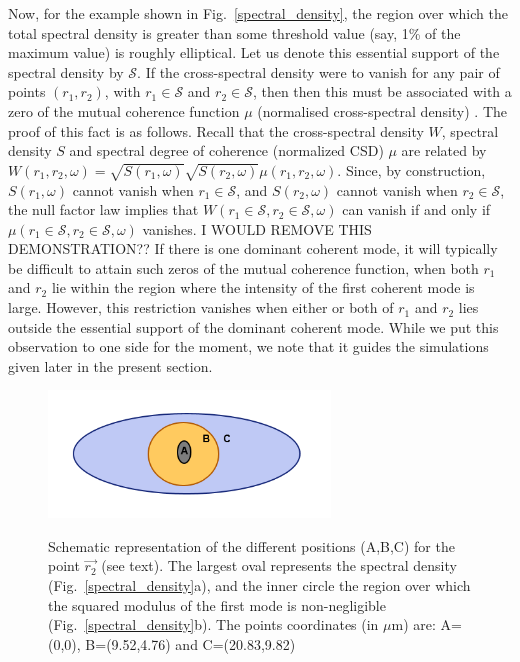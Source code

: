 \documentclass{iucr}              %
\newcommand{\inblue}[1]{{\color{blue}#1}}
\newcommand{\inred}[1]{{\color{red}#1}}
\begin{document}
Now, for the example shown in \inblue{Fig.~\ref{spectral_density}}, the region over which the total spectral density is greater than some threshold value (say, 1\% of the maximum value) is roughly elliptical.  Let us denote this essential support of the spectral density by $\mathcal{S}$.  If the cross-spectral density were to vanish for any pair of points $(r_1,r_2)$, with $r_1 \in \mathcal{S}$ and $r_2 \in \mathcal{S}$, then then this must be associated with a zero of the mutual coherence function $\mu$ (normalised cross-spectral density) \inred{\cite{GburSPIE}. The proof of this fact  \cite{GburSPIE} is as follows.  Recall that the cross-spectral density $W$, spectral density $S$ and \inred{spectral degree of coherence} (normalized CSD) $\mu$ are related by $W(r_1,r_2,\omega)=\sqrt{S(r_1,\omega)}\sqrt{S(r_2,\omega)}\mu(r_1,r_2,\omega)$.  Since, by construction, $S(r_1,\omega)$ cannot vanish when $r_1 \in \mathcal{S}$, and $S(r_2,\omega)$ cannot vanish when $r_2 \in \mathcal{S}$, the null factor law implies that $W(r_1\in \mathcal{S},r_2\in \mathcal{S},\omega)$ can vanish if and only if $\mu(r_1\in \mathcal{S},r_2\in \mathcal{S},\omega)$ vanishes. I WOULD REMOVE THIS DEMONSTRATION??} 
If there is one dominant coherent mode, it will typically be difficult to attain such zeros of the mutual coherence function, when both $r_1$ and $r_2$ lie within the region where the intensity of the first coherent mode is large.  However, this restriction vanishes when either or both of $r_1$ and $r_2$ lies outside the essential support of the dominant coherent mode.  While we put this observation to one side for the moment, we note that it guides the simulations given later in the present section.        

\begin{figure}
\caption{Schematic representation of the different positions (A,B,C) for the point $\vec{r_2}$ (see text). The largest oval represents the spectral density (\inblue{Fig.~\ref{spectral_density}a}), and the inner circle the region over which the squared modulus of the first mode is non-negligible (Fig.~\ref{spectral_density}b).
The points coordinates (in $\mu$m) are: A=(0,0), B=(9.52,4.76) and C=(20.83,9.82)}
\includegraphics[width=7.5cm]{Figures/eye.png}
\label{eye}
\end{figure}
\end{document}
